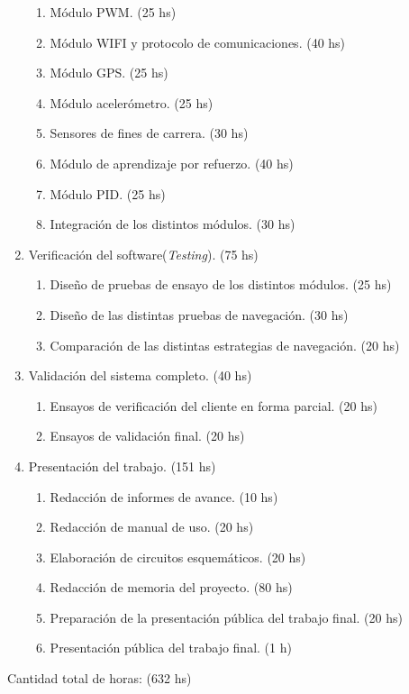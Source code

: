 \documentclass[11pt]{charter}
\begin{document}
\begin{enumerate}
\begin{enumerate}
	\item Módulo PWM. (25 hs)
	\item Módulo WIFI y protocolo de comunicaciones. (40 hs)
	\item Módulo GPS. (25 hs)
	\item Módulo acelerómetro.  (25 hs)
	\item Sensores de fines de carrera. (30 hs)
	\item Módulo de aprendizaje por refuerzo. (40 hs)
	\item Módulo PID. (25 hs)
	\item Integración de los distintos módulos. (30 hs)
	\end{enumerate}	
\item Verificación del software(\textit{Testing}). (75 hs)
	\begin{enumerate}
	\item Diseño de pruebas  de ensayo de los distintos módulos. (25 hs)
	\item Diseño de las distintas pruebas de navegación. (30 hs)
	\item Comparación de las distintas estrategias de navegación. (20 hs)
	\end{enumerate}	
\item Validación del sistema completo. (40 hs)
	\begin{enumerate}
	\item Ensayos de verificación del cliente en forma parcial. (20 hs)
	\item Ensayos de validación final. (20 hs)
	\end{enumerate}	
\item Presentación del trabajo. (151 hs)
	\begin{enumerate}
	\item Redacción de informes de avance. (10 hs)
	\item Redacción de manual de uso. (20 hs)
	\item Elaboración de circuitos esquemáticos. (20 hs)
	\item Redacción de memoria del proyecto. (80 hs)
	\item Preparación de la presentación pública del trabajo final. (20 hs)
	\item Presentación pública del trabajo final. (1 h)
	\end{enumerate}					
\end{enumerate}
Cantidad total de horas: (632 hs)
\end{document}
